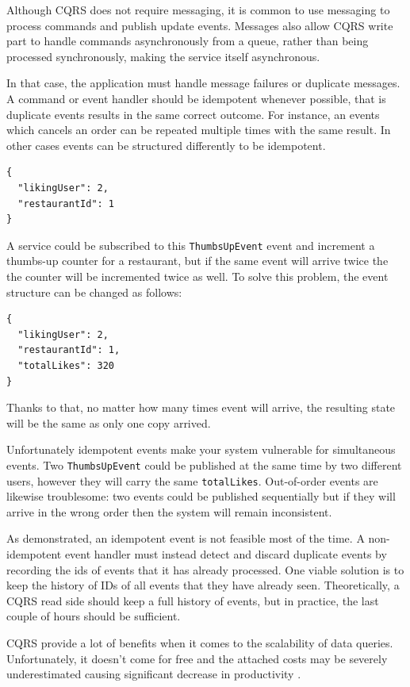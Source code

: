 \documentclass[conference]{IEEEtran}
\begin{document}
Although CQRS does not require messaging, it is common to use messaging to process commands and publish update events. Messages also allow CQRS write part to handle commands asynchronously from a queue, rather than being processed synchronously, making the service itself asynchronous.

In that case, the application must handle message failures or duplicate messages. A command or event handler should be idempotent whenever possible, that is duplicate events results in the same correct outcome. For instance, an events which cancels an order can be repeated multiple times with the same result. In other cases events can be structured differently to be idempotent.

\begin{lstlisting}
{
  "likingUser": 2,
  "restaurantId": 1
}
\end{lstlisting}

A service could be subscribed to this \texttt{ThumbsUpEvent} event and increment a thumbs-up counter for a restaurant, but if the same event will arrive twice the the counter will be incremented twice as well. To solve this problem, the event structure can be changed as follows:

\begin{lstlisting}
{
  "likingUser": 2,
  "restaurantId": 1,
  "totalLikes": 320
}
\end{lstlisting}

Thanks to that, no matter how many times event will arrive, the resulting state will be the same as only one copy arrived.

Unfortunately idempotent events make your system vulnerable for simultaneous events. Two \texttt{ThumbsUpEvent} could be published at the same time by two different users, however they will carry the same \texttt{totalLikes}. Out-of-order events are likewise troublesome: two events could be published sequentially but if they will arrive in the wrong order then the system will remain inconsistent.

As demonstrated, an idempotent event is not feasible most of the time. A non-idempotent event handler must instead detect and discard duplicate events by recording the ids of events that it has already processed. One viable solution is to keep the history of IDs of all events that they have already seen. Theoretically, a CQRS read side should keep a full history of events, but in practice, the last couple of hours should be sufficient.

CQRS provide a lot of benefits when it comes to the scalability of data queries. Unfortunately, it doesn't come for free and the attached costs may be severely underestimated causing significant decrease in productivity .
\end{document}
